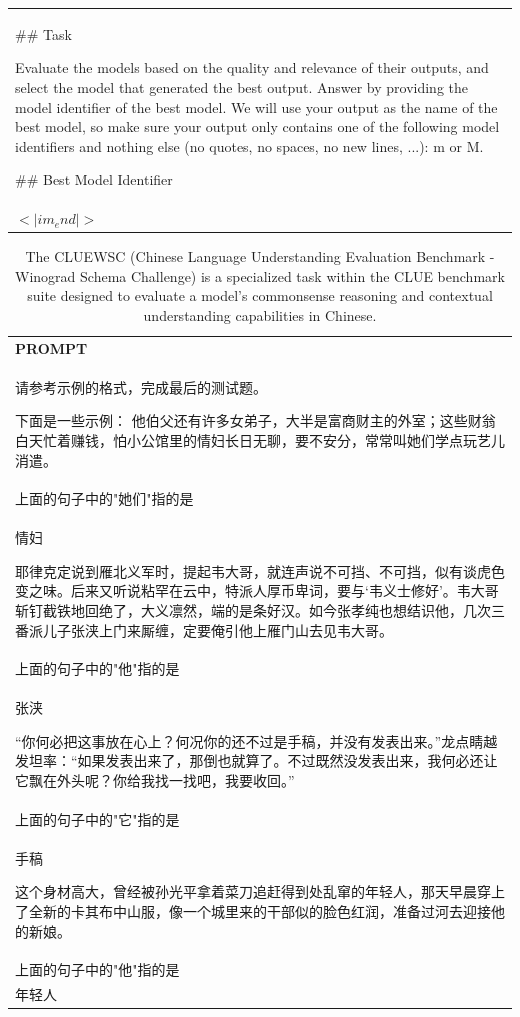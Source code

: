 \begin{table}[h]
\begin{tabular}{p{}}
\#\# Task

Evaluate the models based on the quality and relevance of their outputs, and select the model that generated the best output. Answer by providing the model identifier of the best model. We will use your output as the name of the best model, so make sure your output only contains one of the following model identifiers and nothing else (no quotes, no spaces, no new lines, ...): m or M.

\#\# Best Model Identifier\\
$<|im_end|>$\\ \hline
    \end{tabular}
\end{table}

\begin{table}[h]
    \centering \small
        \caption{The CLUEWSC (Chinese Language Understanding Evaluation Benchmark - Winograd Schema Challenge) is a specialized task within the CLUE benchmark suite designed to evaluate a model's commonsense reasoning and contextual understanding capabilities in Chinese. }
    \label{tab:cluewsc_eval_format_example}
    \begin{tabular}{p{}}
    \hline
    \textbf{PROMPT}\\
    请参考示例的格式，完成最后的测试题。

下面是一些示例：
他伯父还有许多女弟子，大半是富商财主的外室；这些财翁白天忙着赚钱，怕小公馆里的情妇长日无聊，要不安分，常常叫她们学点玩艺儿消遣。\\
上面的句子中的"她们"指的是\\
情妇

耶律克定说到雁北义军时，提起韦大哥，就连声说不可挡、不可挡，似有谈虎色变之味。后来又听说粘罕在云中，特派人厚币卑词，要与‘韦义士修好’。韦大哥斩钉截铁地回绝了，大义凛然，端的是条好汉。如今张孝纯也想结识他，几次三番派儿子张浃上门来厮缠，定要俺引他上雁门山去见韦大哥。\\
上面的句子中的"他"指的是\\
张浃

“你何必把这事放在心上？何况你的还不过是手稿，并没有发表出来。”龙点睛越发坦率：“如果发表出来了，那倒也就算了。不过既然没发表出来，我何必还让它飘在外头呢？你给我找一找吧，我要收回。”\\
上面的句子中的"它"指的是 \\
手稿

这个身材高大，曾经被孙光平拿着菜刀追赶得到处乱窜的年轻人，那天早晨穿上了全新的卡其布中山服，像一个城里来的干部似的脸色红润，准备过河去迎接他的新娘。\\
上面的句子中的"他"指的是 \\
年轻人


\end{tabular}
\end{table}
